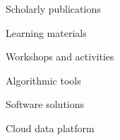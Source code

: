 \item Scholarly publications
\item Learning materials
\item Workshops and activities
\item Algorithmic tools
\item Software solutions
\item Cloud data platform
